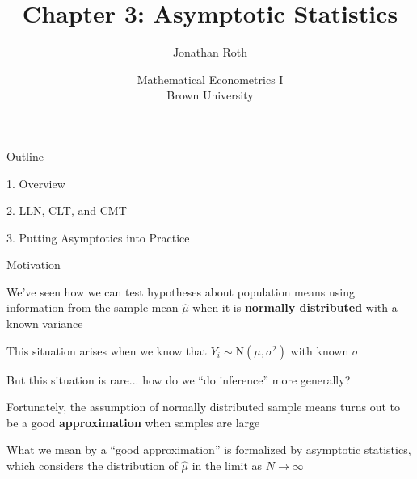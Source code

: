\documentclass[11pt,english,handout]{beamer}
\newenvironment{wideitemize}{\itemize\addtolength{\itemsep}{10pt}}{\enditemize}
\begin{document}
\begin{frame}[noframenumbering]{}
\vspace{0.5cm}
\title[]{Chapter 3: Asymptotic Statistics}
\author{Jonathan Roth}
\date{Mathematical Econometrics I \\ Brown University\\} 
\titlepage {\small{}\ }\thispagestyle{empty} \vspace{-30pt}

\end{frame}

 
\begin{frame}{Outline}

1. Overview
\vspace{0.8cm}

2. LLN, CLT, and CMT
\vspace{0.8cm}

3. Putting Asymptotics into Practice

\end{frame}


\begin{frame}{Motivation}

\begin{wideitemize}
	
\item 
We've seen how we can test hypotheses about population means using information from the sample mean $\hat\mu$ when it is \textbf{normally distributed} with a known variance

\item
This situation arises when we know that $Y_i\sim \mathrm{N}(\mu,\sigma^2)$ with known $\sigma$	

\item
But this situation is rare... how do we ``do inference'' more generally? 

\pause

\item
Fortunately, the assumption of normally distributed sample means turns out to be a good \textbf{approximation} when samples are large

\pause
\item
What we mean by a ``good approximation'' is formalized by asymptotic statistics,  which considers the distribution of $\hat\mu$ in the limit as $N \rightarrow \infty$
	
\end{wideitemize}		

\end{frame}
\end{document}
